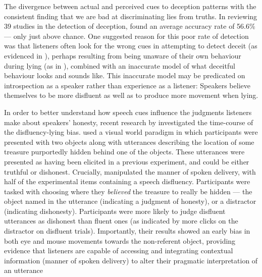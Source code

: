 \documentclass[a4paper,man,natbib]{apa6}
\begin{document}
The divergence between actual and perceived cues to deception patterns with the consistent finding that we are bad at discriminating lies from truths. 
In reviewing 39 studies in the detection of deception, \citet{Vrij2000} found an average accuracy rate of 56.6\% --- only just above chance. 
One suggested reason for this poor rate of detection was that listeners often look for the wrong cues in attempting to detect deceit (as evidenced in \citealt{DePaulo1982}), perhaps resulting from being unaware of their own behaviour during lying (as in \citealt{Vrij1996}), combined with an inaccurate model of what deceitful behaviour looks and sounds like. 
This inaccurate model may be predicated on introspection as a speaker rather than experience as a listener: Speakers believe themselves to be more disfluent \citep{Zuckerman1981a} as well as to produce more movement \citep{Vrij1996} when lying. 

In order to better understand how speech cues influence the judgments listeners make about speakers' honesty, recent research by \citet{Loy2017} investigated the time-course of the disfluency-lying bias.
\citet{Loy2017} used a visual world paradigm in which participants were presented with two objects along with utterances describing the location of some treasure purportedly hidden behind one of the objects.
These utterances were presented as having been elicited in a previous experiment, and could be either truthful or dishonest.
Crucially, \citet{Loy2017} manipulated the manner of spoken delivery, with half of the experimental items containing a speech disfluency.
Participants were tasked with choosing where they \textit{believed} the treasure to really be hidden --- the object named in the utterance (indicating a judgment of honesty), or a distractor (indicating dishonesty).
Participants were more likely to judge disfluent utterances as dishonest than fluent ones (as indicated by more clicks on the distractor on disfluent trials). 
Importantly, their results showed an early bias in both eye and mouse movements towards the non-referent object, providing evidence that listeners are capable of accessing and integrating contextual information (manner of spoken delivery) to alter their pragmatic interpretation of an utterance 
\end{document}
